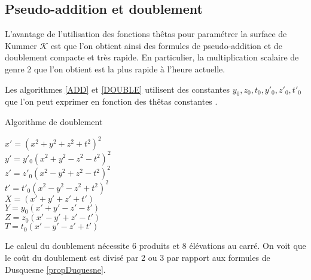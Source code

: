 \documentclass[a4paper]{article}
\theoremstyle{definition}
\theoremstyle{remark}
\numberwithin{equation}{section}
\begin{document}
\subsection{Pseudo-addition et doublement}

L'avantage de l'utilisation des fonctions thêtas pour paramétrer la surface de Kummer $\mathcal{K}$ est que l'on obtient ainsi des formules de pseudo-addition et de doublement compacte et très rapide. En particulier, la multiplication scalaire de genre 2 que l'on obtient est la plus rapide à l'heure actuelle.

Les algorithmes \ref{ADD} et \ref{DOUBLE} utilisent des constantes $y_0,z_0,t_0,y'_0,z'_0,t'_0$ que l'on peut exprimer en fonction des thêtas constantes \citep{gaudry}.

\begin{algorithm}
\label{DOUBLE}
\caption{Algorithme de doublement}
$x' = (x^2 + y^2 + z^2 + t^2)^2$ \\
$y' = y'_0(x^2 + y^2 - z^2 - t^2)^2$ \\
$z' = z'_0(x^2 - y^2 + z^2 - t^2)^2$ \\
$t' = t'_0(x^2 - y^2 - z^2 + t^2)^2$ \\
$X = (x' + y' + z' + t')$ \\
$Y = y_0(x' + y' - z' - t')$ \\
$Z = z_0(x' - y' + z' - t')$ \\
$T = t_0(x' - y' - z' + t')$ \\
\end{algorithm}

Le calcul du doublement nécessite 6 produits et 8 élévations au carré. On voit que le coût du doublement est divisé par 2 ou 3 par rapport aux formules de Dusquesne \ref{propDuquesne}.
\end{document}
